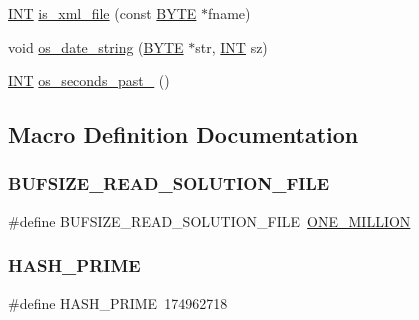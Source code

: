 \begin{DoxyCompactItemize}
\item 
\mbox{\hyperlink{galois_8h_a09fddde158a3a20bd2dcadb609de11dc}{I\+NT}} \mbox{\hyperlink{util_8_c_aec83db8875eff88b15b58c75eedf6f80}{is\+\_\+xml\+\_\+file}} (const \mbox{\hyperlink{galois_8h_ab6cc7b4aeb6ea31aba2b3fbfc83ff5e6}{B\+Y\+TE}} $\ast$fname)
\item 
void \mbox{\hyperlink{util_8_c_a3b046740630541f8d792ecc63c030fd4}{os\+\_\+date\+\_\+string}} (\mbox{\hyperlink{galois_8h_ab6cc7b4aeb6ea31aba2b3fbfc83ff5e6}{B\+Y\+TE}} $\ast$str, \mbox{\hyperlink{galois_8h_a09fddde158a3a20bd2dcadb609de11dc}{I\+NT}} sz)
\item 
\mbox{\hyperlink{galois_8h_a09fddde158a3a20bd2dcadb609de11dc}{I\+NT}} \mbox{\hyperlink{util_8_c_a43f9cdc7d266a857ddea7b92952494dc}{os\+\_\+seconds\+\_\+past\+\_}} ()
\end{DoxyCompactItemize}


\subsection{Macro Definition Documentation}
\mbox{\label{util_8_c_a485440ee7c311b73148491eaaac84578}} 
\subsubsection{\texorpdfstring{B\+U\+F\+S\+I\+Z\+E\+\_\+\+R\+E\+A\+D\+\_\+\+S\+O\+L\+U\+T\+I\+O\+N\+\_\+\+F\+I\+LE}{BUFSIZE\_READ\_SOLUTION\_FILE}}
{\footnotesize\ttfamily \#define B\+U\+F\+S\+I\+Z\+E\+\_\+\+R\+E\+A\+D\+\_\+\+S\+O\+L\+U\+T\+I\+O\+N\+\_\+\+F\+I\+LE~\mbox{\hyperlink{galois_8h_a6a146c1b2155b03eb2ffa3f4ba755034}{O\+N\+E\+\_\+\+M\+I\+L\+L\+I\+ON}}}

\mbox{\label{util_8_c_a3340643b9fb0a58333f04e75ff897e03}} 
\subsubsection{\texorpdfstring{H\+A\+S\+H\+\_\+\+P\+R\+I\+ME}{HASH\_PRIME}}
{\footnotesize\ttfamily \#define H\+A\+S\+H\+\_\+\+P\+R\+I\+ME~174962718}

